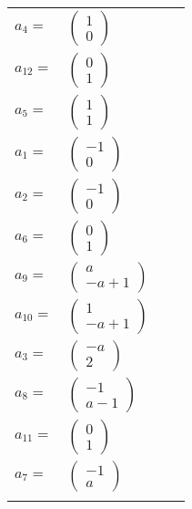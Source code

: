 \documentclass[1p]{elsarticle_modified}
\theoremstyle{definition}
\begin{document}
\begin{tabular}{m{7pt} m{180pt} m{7pt} m{180pt} }
\flushright $a_{4}=$&$\begin{pmatrix}1\\0\end{pmatrix}$ \\
\flushright $a_{12}=$&$\begin{pmatrix}0\\1\end{pmatrix}$ \\
\flushright $a_{5}=$&$\begin{pmatrix}1\\1\end{pmatrix}$ \\
\flushright $a_{1}=$&$\begin{pmatrix}-1\\0\end{pmatrix}$ \\
\flushright $a_{2}=$&$\begin{pmatrix}-1\\0\end{pmatrix}$ \\
\flushright $a_{6}=$&$\begin{pmatrix}0\\1\end{pmatrix}$ \\
\flushright $a_{9}=$&$\begin{pmatrix}a\\- a+1\end{pmatrix}$ \\
\flushright $a_{10}=$&$\begin{pmatrix}1\\- a+1\end{pmatrix}$ \\
\flushright $a_{3}=$&$\begin{pmatrix}- a\\2\end{pmatrix}$ \\
\flushright $a_{8}=$&$\begin{pmatrix}-1\\a-1\end{pmatrix}$ \\
\flushright $a_{11}=$&$\begin{pmatrix}0\\1\end{pmatrix}$ \\
\flushright $a_{7}=$&$\begin{pmatrix}-1\\a\end{pmatrix}$\\&\end{tabular}
\end{document}
